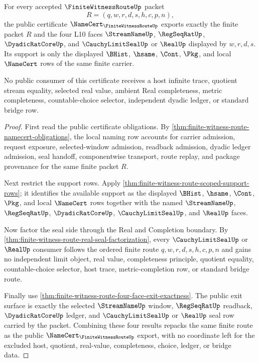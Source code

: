 \begin{theorem}
\label{thm:finite-witness-route-public-namecert-export}
For every accepted $\FiniteWitnessRouteUp$ packet
$$
R=(q,w,r,d,s,h,c,p,n),
$$
the public certificate $\NameCert_{\FiniteWitnessRouteUp}$ exports exactly the finite packet $R$ and the four L10 faces $\StreamNameUp$, $\RegSeqRatUp$, $\DyadicRatCoreUp$, and $\CauchyLimitSealUp$ or $\RealUp$ displayed by $w,r,d,s$. Its support is only the displayed $\BHist$, $\hsame$, $\Cont$, $\Pkg$, and local $\NameCert$ rows of the same finite carrier.

No public consumer of this certificate receives a host infinite trace, quotient stream equality, selected real value, ambient Real completeness, metric completeness, countable-choice selector, independent dyadic ledger, or standard bridge row.
\end{theorem}
\begin{proof}
First read the public certificate obligations. By \autoref{thm:finite-witness-route-namecert-obligations}, the local naming row accounts for carrier admission, request exposure, selected-window admission, readback admission, dyadic ledger admission, seal handoff, componentwise transport, route replay, and package provenance for the same finite packet $R$.

Next restrict the support rows. Apply \autoref{thm:finite-witness-route-scoped-support-rows}; it identifies the available support as the displayed $\BHist$, $\hsame$, $\Cont$, $\Pkg$, and local $\NameCert$ rows together with the named $\StreamNameUp$, $\RegSeqRatUp$, $\DyadicRatCoreUp$, $\CauchyLimitSealUp$, and $\RealUp$ faces.

Now factor the seal side through the Real and Completion boundary. By \autoref{thm:finite-witness-route-real-seal-factorization}, every $\CauchyLimitSealUp$ or $\RealUp$ consumer follows the ordered finite route $q,w,r,d,s,h,c,p,n$ and gains no independent limit object, real value, completeness principle, quotient equality, countable-choice selector, host trace, metric-completion row, or standard bridge route.

Finally use \autoref{thm:finite-witness-route-four-face-exit-exactness}. The public exit surface is exactly the selected $\StreamNameUp$ window, $\RegSeqRatUp$ readback, $\DyadicRatCoreUp$ ledger, and $\CauchyLimitSealUp$ or $\RealUp$ seal row carried by the packet. Combining these four results repacks the same finite route as the public $\NameCert_{\FiniteWitnessRouteUp}$ export, with no coordinate left for the excluded host, quotient, real-value, completeness, choice, ledger, or bridge data.
\end{proof}

